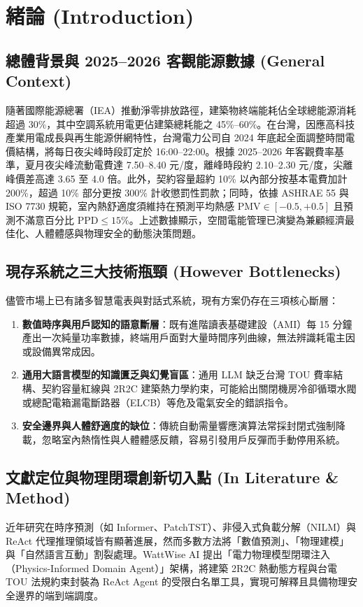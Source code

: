 \documentclass[conference]{IEEEtran}
\begin{document}
\section{緒論 (Introduction)}

\subsection{總體背景與 2025--2026 客觀能源數據 (General Context)}
隨著國際能源總署（IEA）推動淨零排放路徑，建築物終端能耗佔全球總能源消耗超過 30\%，其中空調系統用電更佔建築總耗能之 45\%--60\%。在台灣，因應高科技產業用電成長與再生能源併網特性，台灣電力公司自 2024 年底起全面調整時間電價結構，將每日夜尖峰時段訂定於 16:00--22:00。根據 2025--2026 年客觀費率基準，夏月夜尖峰流動電費達 7.50--8.40 元/度，離峰時段約 2.10--2.30 元/度，尖離峰價差高達 3.65 至 4.0 倍。此外，契約容量超約 10\% 以內部分按基本電費加計 200\%，超過 10\% 部分更按 300\% 計收懲罰性罰款；同時，依據 ASHRAE 55 與 ISO 7730 規範，室內熱舒適度須維持在預測平均熱感 $\text{PMV} \in [-0.5, +0.5]$ 且預測不滿意百分比 $\text{PPD} \le 15\%$。上述數據顯示，空間電能管理已演變為兼顧經濟最佳化、人體體感與物理安全的動態決策問題。

\subsection{現存系統之三大技術瓶頸 (However Bottlenecks)}
儘管市場上已有諸多智慧電表與對話式系統，現有方案仍存在三項核心斷層：
\begin{enumerate}
    \item \textbf{數值時序與用戶認知的語意斷層}：既有進階讀表基礎建設（AMI）每 15 分鐘產出一次純量功率數據，終端用戶面對大量時間序列曲線，無法辨識耗電主因或設備異常成因。
    \item \textbf{通用大語言模型的知識匱乏與幻覺盲區}：通用 LLM 缺乏台灣 TOU 費率結構、契約容量紅線與 2R2C 建築熱力學約束，可能給出關閉機房冷卻循環水閥或總配電箱漏電斷路器（ELCB）等危及電氣安全的錯誤指令。
    \item \textbf{安全邊界與人體舒適度的缺位}：傳統自動需量響應演算法常採封閉式強制降載，忽略室內熱惰性與人體體感反饋，容易引發用戶反彈而手動停用系統。
\end{enumerate}

\subsection{文獻定位與物理閉環創新切入點 (In Literature \& Method)}
近年研究在時序預測（如 Informer、PatchTST）、非侵入式負載分解（NILM）與 ReAct 代理推理領域皆有顯著進展，然而多數方法將「數值預測」、「物理建模」與「自然語言互動」割裂處理。WattWise AI 提出「電力物理模型閉環注入（Physics-Informed Domain Agent）」架構，將建築 2R2C 熱動態方程與台電 TOU 法規約束封裝為 ReAct Agent 的受限白名單工具，實現可解釋且具備物理安全邊界的端到端調度。
\end{document}
